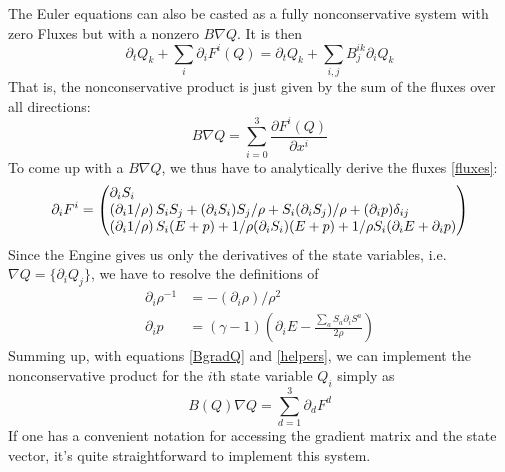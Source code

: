 \documentclass[a4paper]{article}
\newcommand{\pp}[2]{\frac{\partial #1}{\partial #2}}
\newenvironment{pvector}{\begin{pmatrix*}[l]}{\end{pmatrix*}}
\begin{document}
The Euler equations can also be casted as a fully nonconservative system with zero Fluxes but with a nonzero $B\nabla Q$. It is then
\begin{equation}
\partial_t Q_k + \sum_i \partial_i F^i(Q) =
\partial_t Q_k + \sum_{i,j} B^{ik}_j \partial_i Q_k
\end{equation}
That is, the nonconservative product is just given by the sum of 
the fluxes over all directions:
\begin{equation}
B \nabla Q = \sum_{i=0}^3 \pp{F^i(Q)}{x^i}
\end{equation}
To come up with a $B\nabla Q$, we thus have to analytically derive
the fluxes \eqref{fluxes}:
\begin{equation}\label{BgradQ}
\partial_i F^i =
\begin{pvector}
\partial_i S_i
\\
\left( \partial_i 1/\rho \right) S_i S_j
+ (\partial_i S_i) S_j / \rho
+ S_i (\partial_i S_j) / \rho
+ (\partial_i p) \delta_{ij}
\\
\left( \partial_i 1/\rho \right) S_i (E+p)
+ 1/\rho (\partial_i S_i) (E+p)
+ 1/\rho S_i (\partial_i E + \partial_i p)
\end{pvector}
\end{equation}
Since the Engine gives us only the derivatives of the state variables, i.e. $\nabla Q = \{ \partial_i Q_j \}$, we have to resolve the definitions of
\begin{align}\label{helpers}
\partial_i \rho^{-1} &= - (\partial_i \rho) / \rho^2
\\
\partial_i p &= (\gamma-1) \left( \partial_i E
 - \frac{\sum_a S_a \partial_i S^a}{2 \rho} \right)
\end{align}
Summing up, with equations \eqref{BgradQ} and \eqref{helpers}, we
can implement the nonconservative product for the $i$th state
variable $Q_i$ simply as
\begin{equation}
B(Q) \nabla Q = \sum_{d=1}^3 \partial_d F^d
\end{equation}
If one has a convenient notation for accessing the gradient matrix and the state vector, it's quite straightforward to implement this system.
\end{document}
